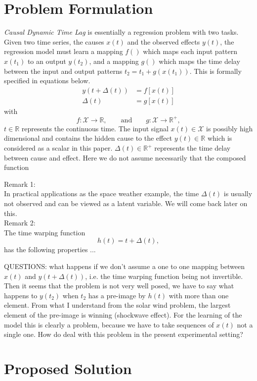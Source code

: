 \documentclass[twoside]{article}
\begin{document}
\section{Problem Formulation}

\emph{Causal Dynamic Time Lag} is essentially a regression problem with two tasks. Given two time series, 
the causes $x(t)$ and the observed effects $y(t)$, the regression model must learn a mapping $f()$ which
maps each input pattern $x(t_1)$ to an output $y(t_2)$, and a mapping $g()$ which maps the time delay between
the input and output patterns $t_2 = t_1 + g(x(t_1))$. This is formally specified in equations below.
\begin{align}
y(t + \Delta(t)) & = f[x(t)]\label{eq:pb1}\\
\Delta(t) & = g[x(t)]\label{eq:pb2} 
\end{align}
with
\[
f: \mathcal{X}  \rightarrow \mathbb{R},\qquad\text{and}\qquad
g: \mathcal{X}  \rightarrow \mathbb{R}^{+},
\]
$t \in \mathbb{R}$ represents the continuous time. The input signal $x(t)\in \mathcal{X}$ is possibly high dimensional and contains the hidden cause to the effect $y(t)\in\mathbb{R}$ which is considered as a scalar in this paper. 
$\Delta(t)\in \mathbb{R}^+$ represents the time delay between cause and effect. Here we do not assume necessarily that the composed function 

Remark 1:\\
In practical applications as the space weather example, the time $\Delta(t)$ is usually  not observed  and can be viewed as a latent variable. We will come back later on this.\\[0.2cm]  
Remark 2:\\
The time warping function 
\[
h(t) = t+\Delta(t),
\]
has the following properties ... 

QUESTIONS: what happens if we don't assume a one to one mapping between $x(t)$
and $y(t+\Delta(t))$, i.e. the time warping function being not invertible. Then it seems that the problem is not very well posed, we have to say what happens to $y(t_2)$ when $t_2$ has a pre-image by $h(t)$ with more than one element.
From what I understand from the solar wind problem, the largest element of the pre-image is winning (shockwave effect). For the learning of the model this is clearly a problem, because we have to take sequences of $x(t)$ not a single one. How do deal with this problem in the present experimental setting?




\section{Proposed Solution}
\end{document}
